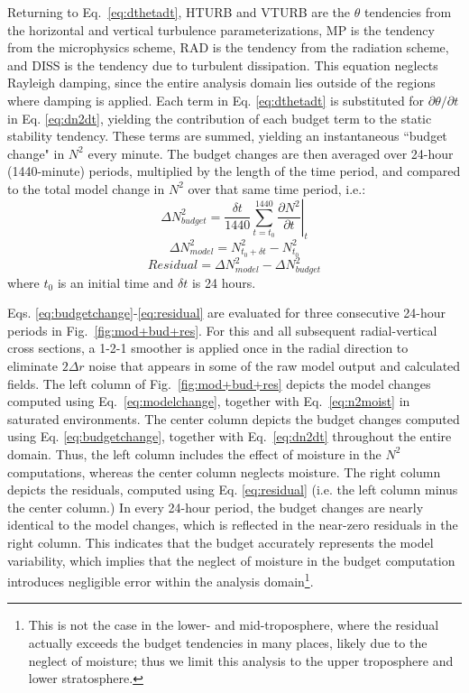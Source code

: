 \documentclass{ametsoc}
\begin{document}
Returning to Eq.~\ref{eq:dthetadt}, HTURB and VTURB are the $\theta$ tendencies from the horizontal and vertical turbulence parameterizations, MP is the tendency from the microphysics scheme, RAD is the tendency from the radiation scheme, and DISS is the tendency due to turbulent dissipation.
This equation neglects Rayleigh damping, since the entire analysis domain lies outside of the regions where damping is applied.
Each term in Eq. \ref{eq:dthetadt} is substituted for ${\partial \theta}/{\partial t}$ in Eq. \ref{eq:dn2dt}, yielding the contribution of each budget term to the static stability tendency.
These terms are summed, yielding an instantaneous ``budget change" in $N^2$ every minute.
The budget changes are then averaged over 24-hour (1440-minute) periods, multiplied by the length of the time period, and compared to the total model change in $N^2$ over that same time period, i.e.:
   \begin{equation} \label{eq:budgetchange}
   \Delta N^2_{budget} = \frac{\delta t}{1440}\sum_{t=t_0}^{1440} \left.\frac{\partial N^2}{\partial t}\right\vert_t
   \end{equation}
   \begin{equation} \label{eq:modelchange}
   \Delta N^2_{model} = N^2_{t_0+\delta t}-N^2_{t_0}
   \end{equation}
   \begin{equation} \label{eq:residual}
   Residual = \Delta N^2_{model}-\Delta N^2_{budget}
   \end{equation}
where $t_0$ is an initial time and $\delta t$ is 24 hours.

Eqs. \ref{eq:budgetchange}-\ref{eq:residual} are evaluated for three consecutive 24-hour periods in Fig.~\ref{fig:mod+bud+res}.
For this and all subsequent radial-vertical cross sections, a 1-2-1 smoother is applied once in the radial direction to eliminate $2\Delta r$ noise that appears in some of the raw model output and calculated fields.
      The left column of Fig.~\ref{fig:mod+bud+res} depicts the model changes computed using Eq.~\ref{eq:modelchange}, together with Eq.~\ref{eq:n2moist} in saturated environments.
The center column depicts the budget changes computed using Eq. \ref{eq:budgetchange}, together with Eq.~\ref{eq:dn2dt} throughout the entire domain.
Thus, the left column includes the effect of moisture in the $N^2$ computations, whereas the center column neglects moisture.
The right column depicts the residuals, computed using Eq. \ref{eq:residual} (i.e. the left column minus the center column.)
In every 24-hour period, the budget changes are nearly identical to the model changes, which is reflected in the near-zero residuals in the right column.
This indicates that the budget accurately represents the model variability, which implies that the neglect of moisture in the budget computation introduces negligible error within the analysis domain\footnote{This is not the case in the lower- and mid-troposphere, where the residual actually exceeds the budget tendencies in many places, likely due to the neglect of moisture; thus we limit this analysis to the upper troposphere and lower stratosphere.}.
\end{document}
